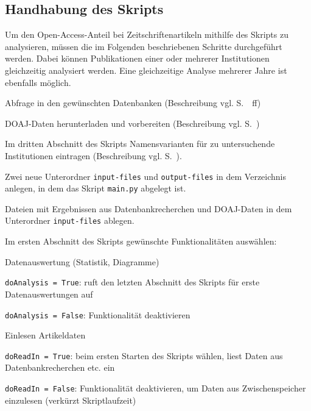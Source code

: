 \subsection{Handhabung des Skripts}
\label{ownanalysis}
Um den Open-Access-Anteil bei Zeitschriftenartikeln mithilfe des Skripts zu analysieren, müssen die im Folgenden beschriebenen Schritte durchgeführt werden. Dabei können Publikationen einer oder mehrerer Institutionen gleichzeitig analysiert werden. Eine gleichzeitige Analyse mehrerer Jahre ist ebenfalls möglich.

\begin{enumerate}
\item Abfrage in den gewünschten Datenbanken (Beschreibung vgl. S.~\pageref{Datenerhebung}~ff)
\item DOAJ-Daten herunterladen und vorbereiten (Beschreibung vgl. S.~\pageref{doaj})
\item Im dritten Abschnitt des Skripts Namensvarianten für zu untersuchende Institutionen eintragen (Beschreibung vgl. S.~\pageref{inst-def}).
\item Zwei neue Unterordner \texttt{input-files} und \texttt{output-files} in dem Verzeichnis anlegen, in dem das Skript \texttt{main.py} abgelegt ist.
\item \label{inputfiles} Dateien mit Ergebnissen aus Datenbankrecherchen und DOAJ-Daten in dem Unterordner \texttt{input-files} ablegen.
\item Im ersten Abschnitt des Skripts gewünschte Funktionalitäten auswählen:
    \item Einlesen Artikeldaten
        \begin{compactitem}
		\item \texttt{doReadIn = True}: beim ersten Starten des Skripts wählen, liest Daten aus Datenbankrecherchen etc. ein
        \item \texttt{doReadIn = False}: Funktionalität deaktivieren, um Daten aus Zwischenspeicher einzulesen (verkürzt Skriptlaufzeit)
		\end{compactitem}

\end{compactitem}
\end{enumerate}
